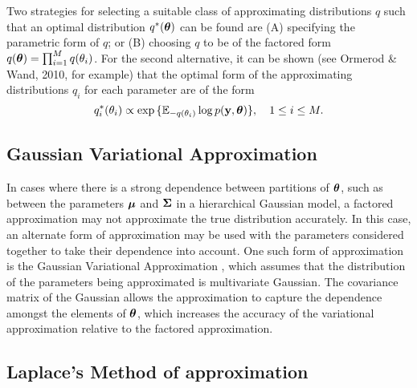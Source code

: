 Two strategies for selecting a suitable class of approximating distributions $q$ such that
an optimal distribution $q^*({\boldsymbol \theta})$ can be found are
(A) specifying the parametric form of $q$; or 
(B) choosing $q$ to be of the factored form $q({\boldsymbol \theta}) = \prod_{i=1}^M q(\theta_i)$.
For the second alternative,
it can be shown (see Ormerod \& Wand, 2010, for example) that the optimal form of the
approximating distributions $q_i$ for each parameter are of the form
\begin{equation}\label{eq:consistency}
	q_i^*(\theta_i) \propto \exp{\{ {\mathbb E}_{-q(\theta_i)} \log p({\bf y}, {\boldsymbol\theta}) \}},  \quad 1\le i\le M.
\end{equation}


\subsection{Gaussian Variational Approximation}

In cases where there is a strong dependence between partitions of ${\boldsymbol \theta}$,  such as between the parameters
${\boldsymbol \mu}$ and ${\boldsymbol \Sigma}$ in a hierarchical Gaussian model, a factored approximation may not approximate the true
distribution accurately. In this case, an alternate form of approximation may be used with the parameters
considered together to take their dependence into account. One such form of approximation is the Gaussian
Variational Approximation \cite{Ormerod2012}, which assumes that the distribution of the parameters being
approximated is multivariate Gaussian. The covariance matrix of the Gaussian allows the approximation to
capture the dependence amongst the elements of ${\boldsymbol \theta}$, which increases the accuracy of the variational
approximation relative to the factored approximation.

\subsection{Laplace's Method of approximation}
\label{sec:laplace_approximation}

